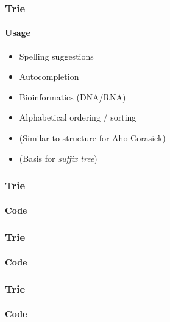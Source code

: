 \frame
{
    \frametitle{Trie}
    \framesubtitle{Usage}
    \begin{itemize}[<+->]
        \item Spelling suggestions
        \item Autocompletion
        \item Bioinformatics (DNA/RNA)
        \item Alphabetical ordering / sorting
        \item (Similar to structure for Aho-Corasick)
        \item (Basis for \emph{suffix tree})
    \end{itemize}
} 

\begin{frame}[fragile]
    \frametitle{Trie}
    \framesubtitle{Code}
    
\end{frame}

\begin{frame}[fragile]
    \frametitle{Trie}
    \framesubtitle{Code}
    
\end{frame}

\begin{frame}[fragile]
    \frametitle{Trie}
    \framesubtitle{Code}
    
\end{frame}
